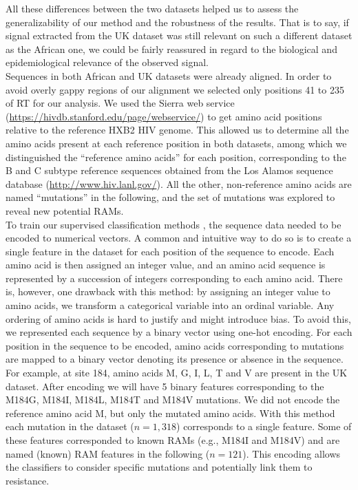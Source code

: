 \documentclass[
  11pt,
  twoside]{scrbook}
\begin{document}
All these differences between the two datasets helped us to assess the
generalizability of our method and the robustness of the results. That
is to say, if signal extracted from the UK dataset was still relevant on
such a different dataset as the African one, we could be fairly
reassured in regard to the biological and epidemiological relevance of
the observed signal.\\
Sequences in both African and UK datasets were already aligned. In order
to avoid overly gappy regions of our alignment we selected only
positions 41 to 235 of RT for our analysis. We used the Sierra web
service (\url{https://hivdb.stanford.edu/page/webservice/}) to get amino
acid positions relative to the reference HXB2 HIV genome. This allowed
us to determine all the amino acids present at each reference position
in both datasets, among which we distinguished the ``reference amino
acids'' for each position, corresponding to the B and C subtype reference
sequences obtained from the Los Alamos sequence database
(\url{http://www.hiv.lanl.gov/}). All the other, non-reference amino acids
are named ``mutations'' in the following, and the set of mutations was
explored to reveal new potential RAMs.\\
To train our supervised classification methods
\autocite{tibshiraniRegressionShrinkageSelection1996,brierVERIFICATIONFORECASTSEXPRESSED1950,gascuelTwelveNumericalSymbolic1998},
the sequence data needed to be encoded to numerical vectors. A common
and intuitive way to do so is to create a single feature in the dataset
for each position of the sequence to encode. Each amino acid is then
assigned an integer value, and an amino acid sequence is represented by
a succession of integers corresponding to each amino acid. There is,
however, one drawback with this method: by assigning an integer value to
amino acids, we transform a categorical variable into an ordinal
variable. Any ordering of amino acids is hard to justify and might
introduce bias. To avoid this, we represented each sequence by a binary
vector using one-hot encoding. For each position in the sequence to be
encoded, amino acids corresponding to mutations are mapped to a binary
vector denoting its presence or absence in the sequence. For example, at
site 184, amino acids M, G, I, L, T and V are present in the UK dataset.
After encoding we will have 5 binary features corresponding to the
M184G, M184I, M184L, M184T and M184V mutations. We did not encode the
reference amino acid M, but only the mutated amino acids. With this
method each mutation in the dataset (\(n=1,318\)) corresponds to a single
feature. Some of these features corresponded to known RAMs (e.g., M184I
and M184V) and are named (known) RAM features in the following
(\(n=121\)). This encoding allows the classifiers to consider specific
mutations and potentially link them to resistance.
\end{document}
